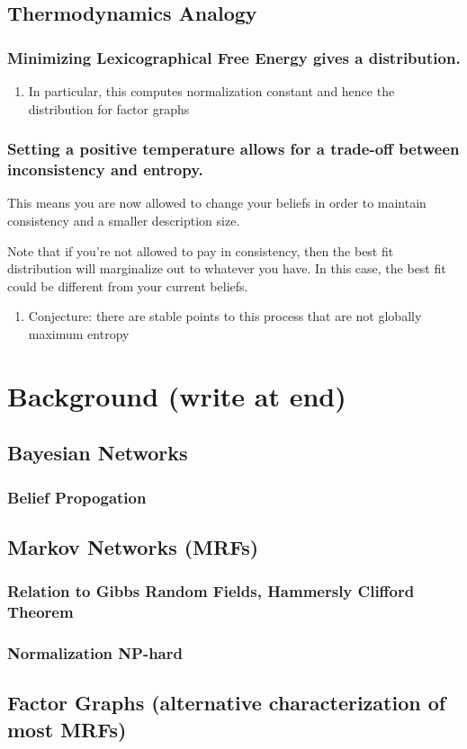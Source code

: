 \documentclass[11pt]{article}
\begin{document}
\subsection{Thermodynamics Analogy}
\label{sec:org913b80c}

\subsubsection{Minimizing Lexicographical Free Energy gives a distribution.}
\label{sec:org26f2bbc}
\begin{enumerate}
\item In particular, this computes normalization constant and hence the distribution for factor graphs
\label{sec:org5d0bbf8}
\end{enumerate}

\subsubsection{Setting a positive temperature allows for a trade-off between inconsistency and entropy.}
\label{sec:org28ea09e}
This means you are now allowed to change your beliefs in order to maintain consistency and a smaller description size.

Note that if you're not allowed to pay in consistency, then the best fit distribution will marginalize out to whatever you have. In this case, the best fit could be different from your current beliefs. 

\begin{enumerate}
\item Conjecture: there are stable points to this process that are not globally maximum entropy
\label{sec:orge38c5cf}
\end{enumerate}




\section{Background (write at end)}
\label{sec:orgb093ab4}
\subsection{Bayesian Networks}
\label{sec:org3cb17cd}
\subsubsection{Belief Propogation}
\label{sec:org5ec6591}
\subsection{Markov Networks (MRFs)}
\label{sec:org34e6552}
\subsubsection{Relation to Gibbs Random Fields, Hammersly Clifford Theorem}
\label{sec:org3976383}
\subsubsection{Normalization NP-hard}
\label{sec:orgaded80e}
\subsection{Factor Graphs (alternative characterization of most MRFs)}
\label{sec:orge53720c}
\end{document}
